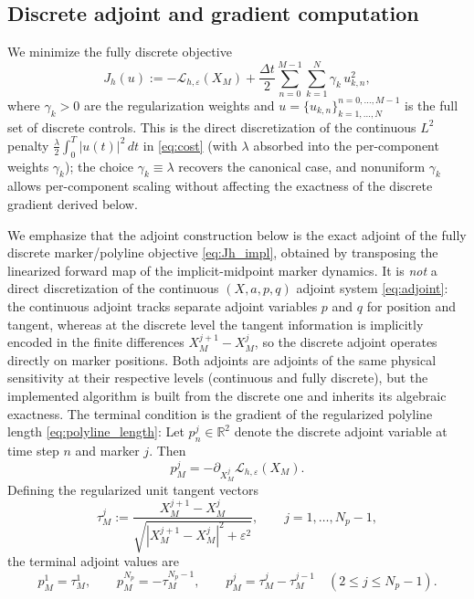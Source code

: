\documentclass[12pt, reqno]{amsart}
\theoremstyle{plain}
\theoremstyle{definition}
\numberwithin{equation}{section}
\numberwithin{figure}{section}
\numberwithin{algorithm}{section}
\begin{document}
\subsection{Discrete adjoint and gradient computation}\label{sec:discrete_adjoint}

We minimize the fully discrete objective
\begin{equation}\label{eq:Jh_impl}
J_h(u)
:=
-\mathcal L_{h,\varepsilon}(X_M)
+\frac{\Delta t}{2}\sum_{n=0}^{M-1}\sum_{k=1}^N
\gamma_k\,u_{k,n}^2,
\end{equation}
where $\gamma_k>0$ are the regularization weights and $u=\{u_{k,n}\}_{k=1,\dots,N}^{n=0,\dots,M-1}$ is the full set of discrete controls. This is the direct discretization of the continuous $L^2$ penalty $\frac\lambda2\int_0^T|u(t)|^2\,dt$ in \eqref{eq:cost} (with $\lambda$ absorbed into the per-component weights $\gamma_k$); the choice $\gamma_k\equiv\lambda$ recovers the canonical case, and nonuniform $\gamma_k$ allows per-component scaling without affecting the exactness of the discrete gradient derived below.

We emphasize that the adjoint construction below is the exact adjoint of the fully discrete marker/polyline objective \eqref{eq:Jh_impl}, obtained by transposing the linearized forward map of the implicit-midpoint marker dynamics. It is \emph{not} a direct discretization of the continuous $(X,a,p,q)$ adjoint system \eqref{eq:adjoint}: the continuous adjoint tracks separate adjoint variables $p$ and $q$ for position and tangent, whereas at the discrete level the tangent information is implicitly encoded in the finite differences $X_M^{j+1}-X_M^j$, so the discrete adjoint operates directly on marker positions. Both adjoints are adjoints of the same physical sensitivity at their respective levels (continuous and fully discrete), but the implemented algorithm is built from the discrete one and inherits its algebraic exactness. The terminal condition is the gradient of the regularized polyline length \eqref{eq:polyline_length}: Let $p_n^j\in\mathbb R^2$ denote the discrete adjoint variable at time step $n$ and marker $j$. Then
\[
p_M^j=-\partial_{X_M^j}\mathcal L_{h,\varepsilon}(X_M).
\]
Defining the regularized unit tangent vectors
\[
\tau_M^j:=\frac{X_M^{j+1}-X_M^j}{\sqrt{|X_M^{j+1}-X_M^j|^2+\varepsilon^2}},
\qquad j=1,\dots,N_p-1,
\]
the terminal adjoint values are
\begin{equation*}
p_M^1=\tau_M^1,
\qquad
p_M^{N_p}=-\tau_M^{N_p-1},
\qquad
p_M^j=\tau_M^j-\tau_M^{j-1}
\quad (2\le j\le N_p-1).
\end{equation*}
\end{document}
